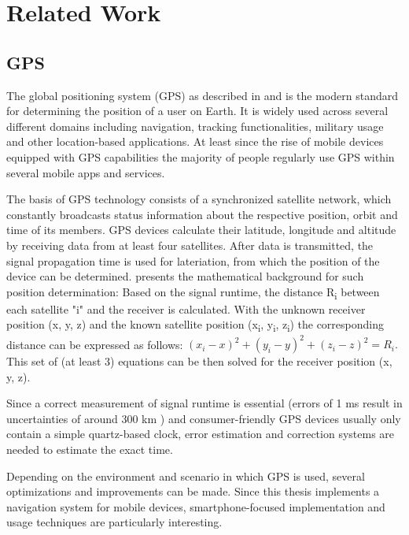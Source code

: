 \chapter{Related Work}
\label{cha:relatedwork}

\section{GPS}
The global positioning system (GPS) as described in \cite{272176} and \cite{1013999415003} is the modern standard for determining the position of a user on Earth. It is widely used across several different domains including navigation, tracking functionalities, military usage and other location-based applications. At least since the rise of mobile devices equipped with GPS capabilities the majority of people regularly use GPS within several mobile apps and services.

The basis of GPS technology consists of a synchronized satellite network, which constantly broadcasts status information about the respective position, orbit and time of its members. GPS devices calculate their latitude, longitude and altitude by receiving data from at least four satellites. After data is transmitted, the signal propagation time is used for lateriation, from which the position of the device can be determined. \cite{lateriation} presents the mathematical background for such position determination: Based on the signal runtime, the distance R\textsubscript{i} between each satellite "i" and the receiver is calculated. With the unknown receiver position (x, y, z) and the known satellite position (x\textsubscript{i}, y\textsubscript{i}, z\textsubscript{i}) the corresponding distance can be expressed as follows: $(x_{i} - x)^{2} + (y_{i} - y)^{2} + (z_{i} - z)^{2} = R_{i}.$ This set of (at least 3) equations can be then solved for the receiver position (x, y, z).

Since a correct measurement of signal runtime is essential (errors of 1 ms result in uncertainties of around 300 km \cite{1013999415003}) and consumer-friendly GPS devices usually only contain a simple quartz-based clock, error estimation and correction systems are needed to estimate the exact time.

Depending on the environment and scenario in which GPS is used, several optimizations and improvements can be made. Since this thesis implements a navigation system for mobile devices, smartphone-focused implementation and usage techniques are particularly interesting.

